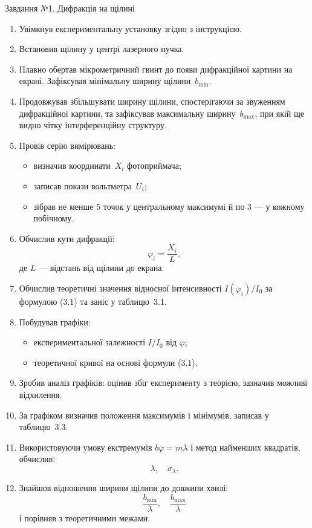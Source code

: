 \documentclass[12pt,a4paper]{article}
\begin{document}
    Завдання №1. Дифракція на щілині

    \begin{enumerate}
    \item Увімкнув експериментальну установку згідно з інструкцією.
    \item Встановив щілину у центрі лазерного пучка.
    \item Плавно обертав мікрометричний гвинт до появи дифракційної картини на екрані. Зафіксував мінімальну ширину щілини~$b_{\min}$.
    \item Продовжував збільшувати ширину щілини, спостерігаючи за звуженням дифракційної картини, та зафіксував максимальну ширину~$b_{\max}$, при якій ще видно чітку інтерференційну структуру.
    \item Провів серію вимірювань:
        \begin{itemize}
        \item визначив координати~$X_i$ фотоприймача;
        \item записав покази вольтметра~$U_i$;
        \item зібрав не менше 5 точок у центральному максимумі й по 3 — у кожному побічному.
        \end{itemize}
    \item Обчислив кути дифракції:
        \[
        \varphi_i = \frac{X_i}{L},
        \]
        де $L$ — відстань від щілини до екрана.
    \item Обчислив теоретичні значення відносної інтенсивності $I(\varphi_i)/I_0$ за формулою (3.1) та заніс у таблицю~3.1.
    \item Побудував графіки:
        \begin{itemize}
        \item експериментальної залежності $I/I_0$ від $\varphi$;
        \item теоретичної кривої на основі формули (3.1).
        \end{itemize}
    \item Зробив аналіз графіків: оцінив збіг експерименту з теорією, зазначив можливі відхилення.
    \item За графіком визначив положення максимумів і мінімумів, записав у таблицю~3.3.
    \item Використовуючи умову екстремумів $b\varphi = m\lambda$ і метод найменших квадратів, обчислив:
        \[
        \lambda, \quad \sigma_\lambda.
        \]
    \item Знайшов відношення ширини щілини до довжини хвилі:
        \[
        \frac{b_{\min}}{\lambda}, \quad \frac{b_{\max}}{\lambda}
        \]
        і порівняв з теоретичними межами.
    \end{enumerate}
\end{document}
